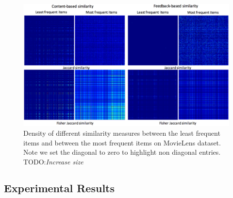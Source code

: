 \begin{figure}
\centerline{
  \includegraphics[scale=.21]{Sparsity.png}}
\caption[]{Density of different similarity measures between the least frequent items and between the most frequent items on MovieLens dataset. Note we set the diagonal to zero to highlight non diagonal entries. TODO:\textit{Increase size}}
\label{fig:sparsity}
\end{figure}


\subsection{Experimental Results}

